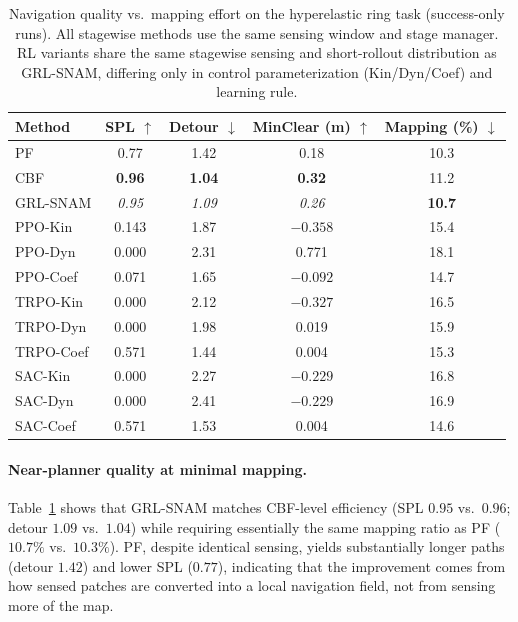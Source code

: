 \documentclass{article} %
\begin{document}
\begin{table}[h!]
\centering
\caption{Navigation quality vs.\ mapping effort on the hyperelastic ring task (success-only runs). 
All stagewise methods use the same sensing window and stage manager. RL variants share the same stagewise sensing and short-rollout distribution as GRL-SNAM, differing only in control parameterization (Kin/Dyn/Coef) and learning rule.}
\vspace{0.4em}
\begin{tabular}{lcccc}
\toprule
Method       & SPL $\uparrow$ & Detour $\downarrow$ & MinClear (m) $\uparrow$ & Mapping (\%) $\downarrow$ \\
\midrule
PF           & 0.77     & 1.42 & 0.18           & 10.3 \\
CBF          & \textbf{0.96}     & \textbf{1.04} & \textbf{0.32}  & 11.2 \\
GRL-SNAM     & \textit{0.95} & \textit{1.09} & \textit{0.26} & \textbf{10.7} \\
\midrule
PPO-Kin      & 0.143    & 1.87 & $-0.358$       & 15.4 \\
PPO-Dyn      & 0.000    & 2.31 & 0.771          & 18.1 \\
PPO-Coef     & 0.071    & 1.65 & $-0.092$       & 14.7 \\
TRPO-Kin     & 0.000    & 2.12 & $-0.327$       & 16.5 \\
TRPO-Dyn     & 0.000    & 1.98 & 0.019          & 15.9 \\
TRPO-Coef    & 0.571    & 1.44 & 0.004          & 15.3 \\
SAC-Kin      & 0.000    & 2.27 & $-0.229$       & 16.8 \\
SAC-Dyn      & 0.000    & 2.41 & $-0.229$       & 16.9 \\
SAC-Coef     & 0.571    & 1.53 & 0.004          & 14.6 \\
\bottomrule
\end{tabular}
\label{tab:success_only}
\end{table}

\paragraph{Near-planner quality at minimal mapping.}
Table~\ref{tab:success_only} shows that GRL-SNAM matches CBF-level efficiency (SPL $0.95$ vs.\ $0.96$; detour $1.09$ vs.\ $1.04$) while requiring essentially the same mapping ratio as PF ($10.7\%$ vs.\ $10.3\%$). 
PF, despite identical sensing, yields substantially longer paths (detour $1.42$) and lower SPL ($0.77$), indicating that the improvement comes from how sensed patches are converted into a local navigation field, not from sensing more of the map.
\end{document}
